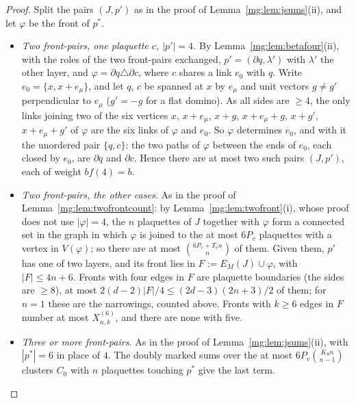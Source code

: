\documentclass[11pt,a4paper]{article}
\theoremstyle{definition}
\theoremstyle{remark}
\begin{document}
\begin{proof}
Split the pairs $(J,p')$ as in the proof of Lemma~\ref{mg:lem:jsums}(ii), and let $\varphi$ be the front of $p^*$.
\begin{itemize}
\item \emph{Two front-pairs, one plaquette $c$, $|p'|=4$.} By Lemma~\ref{mg:lem:betafour}(ii), with the roles of the two front-pairs exchanged, $p'=(\partial q,\lambda')$ with
$\lambda'$ the other layer, and $\varphi=\partial q\triangle\partial c$, where $c$ shares a link $e_0$ with $q$. Write $e_0=\{x,x+e_\mu\}$, and let $q$, $c$ be spanned at $x$ by
$e_\mu$ and unit vectors $g\ne g'$ perpendicular to $e_\mu$ ($g'=-g$ for a flat domino). As all sides are $\ge4$, the only links joining two of the six vertices
$x$, $x+e_\mu$, $x+g$, $x+e_\mu+g$, $x+g'$, $x+e_\mu+g'$ of $\varphi$ are the six links of $\varphi$ and $e_0$. So $\varphi$ determines $e_0$, and with it the unordered pair $\{q,c\}$: the
two paths of $\varphi$ between the ends of $e_0$, each closed by $e_0$, are $\partial q$ and $\partial c$. Hence there are at most two such pairs $(J,p')$, each of
weight $bf(4)=b$.
\item \emph{Two front-pairs, the other cases.} As in the proof of Lemma~\ref{mg:lem:twofrontcount}: by Lemma~\ref{mg:lem:twofront}(i), whose proof does
not use $|\varphi|=4$, the $n$ plaquettes of $J$ together with $\varphi$ form a connected set in the graph in which $\varphi$ is joined to the at most $6P_v$
plaquettes with a vertex in $V(\varphi)$; so there are at most $\binom{6P_v+T_vn}{n}$ of them. Given them, $p'$ has one of two layers, and its front lies in
$F:=E_M(J)\cup\varphi$, with $|F|\le4n+6$. Fronts with four edges in $F$ are plaquette boundaries (the sides are $\ge8$), at most $2(d-2)|F|/4\le(2d-3)(2n+3)/2$ of
them; for $n=1$ these are the narrowings, counted above. Fronts with $k\ge6$ edges in $F$ number at most $X^{(6)}_{n,k}$, and there are none with five.
\item \emph{Three or more front-pairs.} As in the proof of Lemma~\ref{mg:lem:jsums}(ii), with $|p^*|=6$ in place of $4$. The doubly marked sums over the at most
$6P_v\binom{K_Sn}{n-1}$ clusters $C_0$ with $n$ plaquettes touching $p^*$ give the last term.\qedhere
\end{itemize}
\end{proof}
\end{document}
